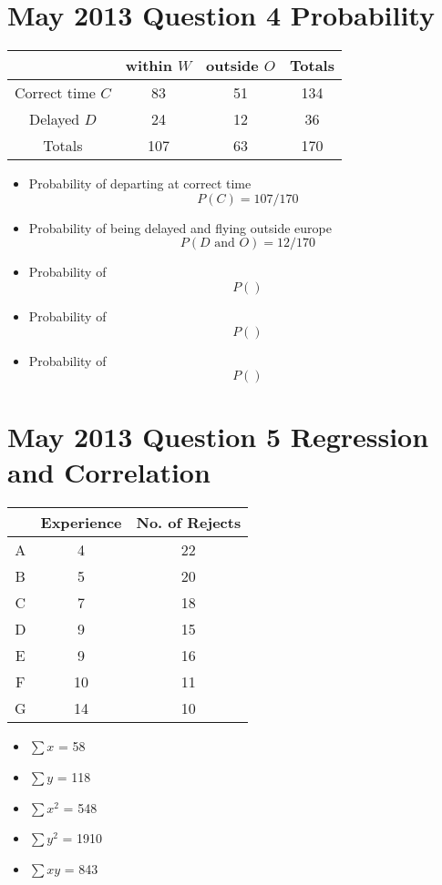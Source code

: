 \documentclass[a4paper,12pt]{article}
\begin{document}
\section*{May 2013 Question 4 Probability}
\begin{center}
\begin{tabular}{|c|c|c|c|}
\hline  & within $W$ & outside $O$ & Totals \\ 
\hline Correct time $C$ & 83 & 51 & 134 \\ 
\hline Delayed $D$ & 24 & 12 & 36 \\ 
\hline Totals & 107 & 63 & 170 \\ 
\hline 
\end{tabular} 
\end{center}\begin{itemize}
\item Probability of departing at correct time
\[P(C) = 107/170\]



\item Probability of being delayed and flying outside europe 
\[P(D  \mbox{ and } O) = 12/170\]
\item Probability of 
\[P() \]
\item Probability of 
\[P() \]
\item Probability of 
\[P() \]
\end{itemize}
\section*{May 2013 Question 5 Regression and Correlation}
\begin{center}
\begin{tabular}{|c|c|c|}
\hline  & Experience & No. of Rejects \\ 
\hline A & 4 & 22 \\ 
\hline B & 5 & 20 \\ 
\hline C & 7 & 18 \\ 
\hline D & 9 & 15 \\ 
\hline E & 9 & 16 \\ 
\hline F & 10 & 11 \\ 
\hline G & 14 & 10 \\ 
\hline 
\end{tabular} 
\end{center}

\begin{itemize}
\item $\sum x$ = 58
\item $\sum y$ = 118
\item $\sum x^2$ = 548
\item $\sum y^2$ = 1910
\item $\sum xy$ = 843
\end{itemize}
\end{document}

